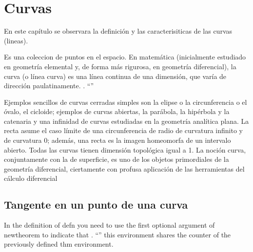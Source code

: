 \chapter{Curvas}
\setcounter{page}{1}

En este capítulo se observara la definición y las caracterisiticas de las curvas (lineas).

\begin{defn}[Curva]
Es una coleccion de puntos en el espacio. En matemática (inicialmente estudiado en geometría elemental y, de forma más rigurosa, en geometría diferencial), la curva (o línea curva) es una línea continua de una dimensión, que varía de dirección paulatinamente. \cite{hilbert2020geometry}. ``''
\end{defn}

Ejemplos sencillos de curvas cerradas simples son la elipse o la circunferencia o el óvalo, el cicloide; ejemplos de curvas abiertas, la parábola, la hipérbola y la catenaria y una infinidad de curvas estudiadas en la geometría analítica plana. La recta asume el caso límite de una circunferencia de radio de curvatura infinito y de curvatura 0; además, una recta es la imagen homeomorfa de un intervalo abierto. Todas las curvas tienen dimensión topológica igual a 1. La noción curva, conjuntamente con la de superficie, es uno de los objetos primordiales de la geometría diferencial, ciertamente con profusa aplicación de las herramientas del cálculo diferencial

\section{Tangente en un punto de una curva}
\begin{defn}[Tangente] In the definition of defn you need to use the first optional argument of  newtheorem to indicate that \cite{hilbert2020geometry}. ``''  this environment shares the counter of the previously defined thm environment.\end{defn}
\cite{reyes} \cite{www}

